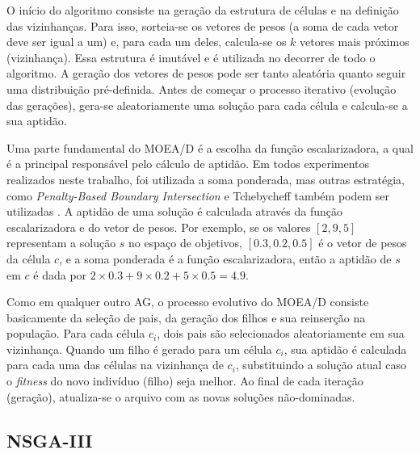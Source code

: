 O início do algoritmo consiste na geração da estrutura de células e na definição das vizinhanças. Para isso, sorteia-se os vetores de pesos (a soma de cada vetor deve ser igual a um) e, para cada um deles, calcula-se os $k$ vetores mais próximos (vizinhança). Essa estrutura é imutável e é utilizada no decorrer de todo o algoritmo. A geração dos vetores de pesos pode ser tanto aleatória quanto seguir uma distribuição pré-definida. Antes de começar o processo iterativo (evolução das gerações), gera-se aleatoriamente uma solução para cada célula e calcula-se a sua aptidão. 

Uma parte fundamental do MOEA/D é a escolha da função escalarizadora, a qual é a principal responsável pelo cálculo de aptidão. Em todos experimentos realizados neste trabalho, foi utilizada a soma ponderada, mas outras estratégia, como \textit{Penalty-Based Boundary Intersection} e Tchebycheff também podem ser utilizadas \cite{Zhang2007}. A aptidão de uma solução é calculada através da função escalarizadora e do vetor de pesos. Por exemplo, se os valores $[2, 9, 5]$ representam a solução $s$ no espaço de objetivos, $[0.3, 0.2, 0.5]$ é o vetor de pesos da célula $c$, e a soma ponderada é a função escalarizadora, então a aptidão de $s$ em $c$ é dada por $2 \times 0.3 + 9 \times 0.2 + 5 \times 0.5 = 4.9$.

Como em qualquer outro AG, o processo evolutivo do MOEA/D consiste basicamente da seleção de pais, da geração dos filhos e sua reinserção na população. Para cada célula $c_i$, dois pais são selecionados aleatoriamente em sua vizinhança. Quando um filho é gerado para um célula $c_i$, sua aptidão é calculada para cada uma das células na vizinhança de $c_i$, substituindo a solução atual caso o \textit{fitness} do novo indivíduo (filho) seja melhor. Ao final de cada iteração (geração), atualiza-se o arquivo com as novas soluções não-dominadas.

\subsection{NSGA-III}

